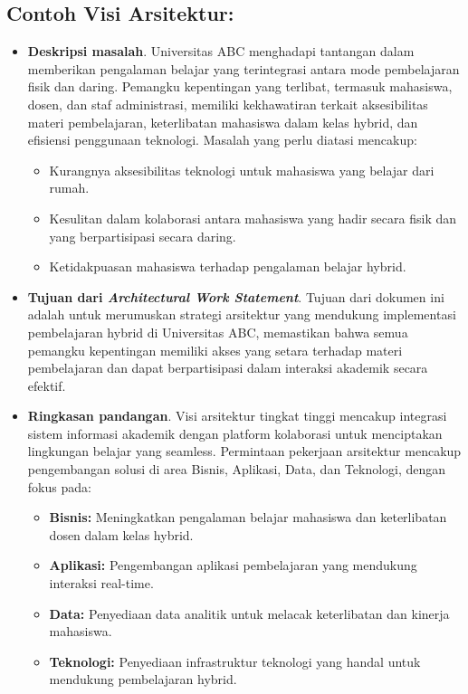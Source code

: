 \subsection*{Contoh Visi Arsitektur:}
\begin{itemize}
	\item \textbf{Deskripsi masalah}. Universitas ABC menghadapi tantangan dalam memberikan pengalaman belajar yang terintegrasi antara mode pembelajaran fisik dan daring. Pemangku kepentingan yang terlibat, termasuk mahasiswa, dosen, dan staf administrasi, memiliki kekhawatiran terkait aksesibilitas materi pembelajaran, keterlibatan mahasiswa dalam kelas hybrid, dan efisiensi penggunaan teknologi. Masalah yang perlu diatasi mencakup:
	\begin{itemize}
		\item Kurangnya aksesibilitas teknologi untuk mahasiswa yang belajar dari rumah.
		\item Kesulitan dalam kolaborasi antara mahasiswa yang hadir secara fisik dan yang berpartisipasi secara daring.
		\item Ketidakpuasan mahasiswa terhadap pengalaman belajar hybrid.
	\end{itemize}
	
	\item \textbf{Tujuan dari \textit{Architectural Work Statement}}. Tujuan dari dokumen ini adalah untuk merumuskan strategi arsitektur yang mendukung implementasi pembelajaran hybrid di Universitas ABC, memastikan bahwa semua pemangku kepentingan memiliki akses yang setara terhadap materi pembelajaran dan dapat berpartisipasi dalam interaksi akademik secara efektif.
	
	\item \textbf{Ringkasan pandangan}. Visi arsitektur tingkat tinggi mencakup integrasi sistem informasi akademik dengan platform kolaborasi untuk menciptakan lingkungan belajar yang seamless. Permintaan pekerjaan arsitektur mencakup pengembangan solusi di area Bisnis, Aplikasi, Data, dan Teknologi, dengan fokus pada:
	\begin{itemize}
		\item \textbf{Bisnis:} Meningkatkan pengalaman belajar mahasiswa dan keterlibatan dosen dalam kelas hybrid.
		\item \textbf{Aplikasi:} Pengembangan aplikasi pembelajaran yang mendukung interaksi real-time.
		\item \textbf{Data:} Penyediaan data analitik untuk melacak keterlibatan dan kinerja mahasiswa.
		\item \textbf{Teknologi:} Penyediaan infrastruktur teknologi yang handal untuk mendukung pembelajaran hybrid.
	\end{itemize}
	

\end{itemize}

